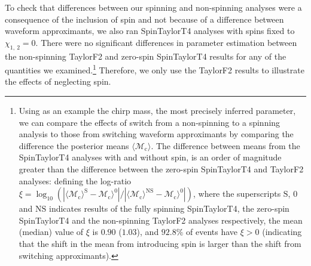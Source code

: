 To check that differences between our spinning and non-spinning analyses were a consequence of the inclusion of spin and not because of a difference between waveform approximants, we also ran SpinTaylorT4 analyses with spins fixed to $\chi_{1,~2}=0$. There were no significant differences in parameter estimation between the non-spinning TaylorF2 and zero-spin SpinTaylorT4 results for any of the quantities we examined.\footnote{Using as an example the chirp mass, the most precisely inferred parameter, we can compare the effects of switch from a non-spinning to a spinning analysis to those from switching waveform approximants by comparing the difference the posterior means $\langle \mathcal{M}_\mathrm{c}\rangle$. The difference between means from the SpinTaylorT4 analyses with and without spin, is an order of magnitude greater than the difference between the zero-spin SpinTaylorT4 and TaylorF2 analyses: defining the log-ratio $\xi = \log_{10}(|\langle \mathcal{M}_\mathrm{c}\rangle^\mathrm{S} - \mathcal{M}_\mathrm{c}\rangle^0|/|\langle \mathcal{M}_\mathrm{c}\rangle^\mathrm{NS} - \mathcal{M}_\mathrm{c}\rangle^0|)$, where the superscripts $\mathrm{S}$, $0$ and $\mathrm{NS}$ indicates results of the fully spinning SpinTaylorT4, the zero-spin SpinTaylorT4 and the non-spinning TaylorF2 analyses respectively, the mean (median) value of $\xi$ is $0.90$ ($1.03$), and $92.8\%$ of events have $\xi > 0$ (indicating that the shift in the mean from introducing spin is larger than the shift from switching approximants).} Therefore, we only use the TaylorF2 results to illustrate the effects of neglecting spin.
  